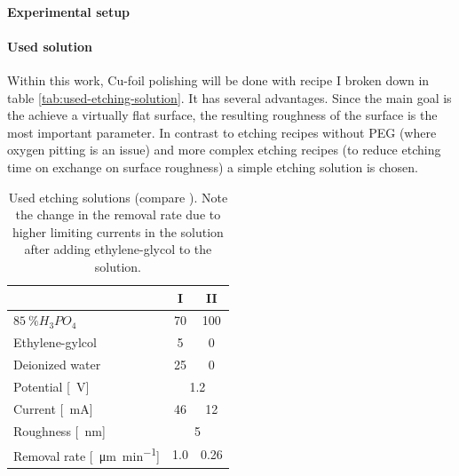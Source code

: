 


\paragraph{Experimental setup}

\paragraph{Used solution}
Within this work, Cu-foil polishing will be done with recipe I broken down in table \ref{tab:used-etching-solution}. It has several advantages. Since the main goal is the achieve a virtually flat surface, the resulting roughness of the surface is the most important parameter. In contrast to etching recipes without PEG (where oxygen pitting is an issue) and more complex etching recipes (to reduce etching time on exchange on surface roughness) a simple etching solution is chosen.

\begin{table}\centering
	\caption{Used etching solutions (compare \cite[130]{jinshan_electrochemical_2004}). Note the change in the removal rate due to higher limiting currents in the solution after adding ethylene-glycol to the solution.}
	\begin{tabular}{lcc}
		& I & II \\ \hline \hline
		$\SI{85}{\percent} H_3PO_4$ & 70 & 100 \\
		Ethylene-gylcol & 5 & 0 \\
		Deionized water & 25 & 0 \\ \hline
		Potential [\SI{}{\V}] & \multicolumn{2}{c}{\SI{1.2}{}} \\
		Current [\SI{}{\mA}] & 46 & 12\\
		Roughness [\SI{}{\nm}] & \multicolumn{2}{c}{\SI{5}{}} \\
		Removal rate [\SI{}{\micro\meter\per\minute}] & \SI{1,0}{} & \SI{0,26}{}\\
	\end{tabular}
	\label{table:used-etching-solutions}
\end{table}

